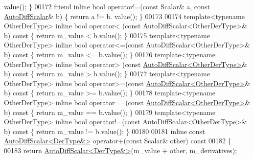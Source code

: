 \begin{DoxyCode}
      value(); \}
00172     \textcolor{keyword}{friend} \textcolor{keyword}{inline} \textcolor{keywordtype}{bool} operator!=(\textcolor{keyword}{const} Scalar& a, \textcolor{keyword}{const} \hyperlink{class_eigen_1_1_auto_diff_scalar}{AutoDiffScalar}& b) \{ \textcolor{keywordflow}{return} a != b.
      value(); \}
00173 
00174     \textcolor{keyword}{template}<\textcolor{keyword}{typename} OtherDerType> \textcolor{keyword}{inline} \textcolor{keywordtype}{bool} operator< (const AutoDiffScalar<OtherDerType>& b) \textcolor{keyword}{const}  \{ \textcolor{keywordflow}{
      return} m\_value <  b.value(); \}
00175     \textcolor{keyword}{template}<\textcolor{keyword}{typename} OtherDerType> \textcolor{keyword}{inline} \textcolor{keywordtype}{bool} operator<=(const AutoDiffScalar<OtherDerType>& b) \textcolor{keyword}{const}  \{ \textcolor{keywordflow}{
      return} m\_value <= b.value(); \}
00176     \textcolor{keyword}{template}<\textcolor{keyword}{typename} OtherDerType> \textcolor{keyword}{inline} \textcolor{keywordtype}{bool} operator> (\textcolor{keyword}{const} 
      \hyperlink{class_eigen_1_1_auto_diff_scalar}{AutoDiffScalar<OtherDerType>}& b)\textcolor{keyword}{ const  }\{ \textcolor{keywordflow}{return} m\_value >  b.value(); \}
00177     \textcolor{keyword}{template}<\textcolor{keyword}{typename} OtherDerType> \textcolor{keyword}{inline} \textcolor{keywordtype}{bool} operator>=(\textcolor{keyword}{const} 
      \hyperlink{class_eigen_1_1_auto_diff_scalar}{AutoDiffScalar<OtherDerType>}& b)\textcolor{keyword}{ const  }\{ \textcolor{keywordflow}{return} m\_value >= b.value(); \}
00178     \textcolor{keyword}{template}<\textcolor{keyword}{typename} OtherDerType> \textcolor{keyword}{inline} \textcolor{keywordtype}{bool} operator==(\textcolor{keyword}{const} 
      \hyperlink{class_eigen_1_1_auto_diff_scalar}{AutoDiffScalar<OtherDerType>}& b)\textcolor{keyword}{ const  }\{ \textcolor{keywordflow}{return} m\_value == b.value(); \}
00179     \textcolor{keyword}{template}<\textcolor{keyword}{typename} OtherDerType> \textcolor{keyword}{inline} \textcolor{keywordtype}{bool} operator!=(\textcolor{keyword}{const} 
      \hyperlink{class_eigen_1_1_auto_diff_scalar}{AutoDiffScalar<OtherDerType>}& b)\textcolor{keyword}{ const  }\{ \textcolor{keywordflow}{return} m\_value != b.value(); \}
00180 
00181     \textcolor{keyword}{inline} \textcolor{keyword}{const} \hyperlink{class_eigen_1_1_auto_diff_scalar}{AutoDiffScalar<DerType&>} operator+(\textcolor{keyword}{const} Scalar& other)\textcolor{keyword}{ const}
00182 \textcolor{keyword}{    }\{
00183       \textcolor{keywordflow}{return} \hyperlink{class_eigen_1_1_auto_diff_scalar}{AutoDiffScalar<DerType&>}(m\_value + other, m\_derivatives);

\end{DoxyCode}

